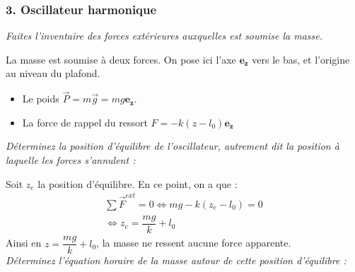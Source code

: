 \documentclass[a4paper,10pt,twoside]{article}
\begin{document}
\newpage

\subsubsection*{3. Oscillateur harmonique}
 
\noindent\textit{Faites l'inventaire des forces extérieures auxquelles est soumise la masse.}

\noindent La masse est soumise à deux forces. On pose ici l'axe $\mathbf{e_z}$ vers le bas, et l'origine au niveau du plafond.

\begin{itemize}
    \item Le poids $\vec P = m\vec g = mg\mathbf{ e_z}$.
    \item La force de rappel du ressort $F = -k(z-l_0)\mathbf{ e_z}$  \\ 
\end{itemize}
\noindent\textit{Déterminez la position d'équilibre de l'oscillateur, autrement dit la position à laquelle les forces s'annulent :}

\noindent Soit $z_e$ la position d'équilibre. En ce point, on a que : 
\begin{gather*}
    \sum \vec{F}^{ext}=0 \iff mg-k(z_e-l_0) =0 \\
    \iff z_e = \dfrac{mg}{k}+l_0
\end{gather*}
Ainsi en $z=\dfrac{mg}{k}+l_0$, la masse ne ressent aucune force apparente.\\

\noindent\textit{Déterminez l'équation horaire de la masse autour de cette position d'équilibre :}
\end{document}
